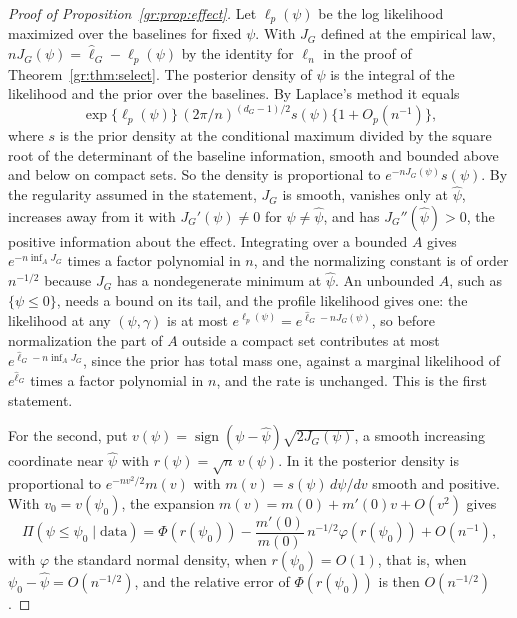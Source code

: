 \begin{proof}[Proof of Proposition~\ref{gr:prop:effect}]
Let $\ell_p(\psi)$ be the log likelihood maximized over the baselines for fixed $\psi$. With $J_G$ defined at the empirical law, $nJ_G(\psi)=\hat\ell_G-\ell_p(\psi)$ by the identity for $\ell_n$ in the proof of Theorem~\ref{gr:thm:select}. The posterior density of $\psi$ is the integral of the likelihood and the prior over the baselines. By Laplace's method it equals
\[
\exp\{\ell_p(\psi)\}\,(2\pi/n)^{(d_G-1)/2}s(\psi)\{1+O_p(n^{-1})\},
\]
where $s$ is the prior density at the conditional maximum divided by the square root of the determinant of the baseline information, smooth and bounded above and below on compact sets. So the density is proportional to $e^{-nJ_G(\psi)}s(\psi)$. By the regularity assumed in the statement, $J_G$ is smooth, vanishes only at $\hat\psi$, increases away from it with $J_G'(\psi)\neq0$ for $\psi\neq\hat\psi$, and has $J_G''(\hat\psi)>0$, the positive information about the effect. Integrating over a bounded $A$ gives $e^{-n\inf_AJ_G}$ times a factor polynomial in $n$, and the normalizing constant is of order $n^{-1/2}$ because $J_G$ has a nondegenerate minimum at $\hat\psi$. An unbounded $A$, such as $\{\psi\le0\}$, needs a bound on its tail, and the profile likelihood gives one: the likelihood at any $(\psi,\gamma)$ is at most $e^{\ell_p(\psi)}=e^{\hat\ell_G-nJ_G(\psi)}$, so before normalization the part of $A$ outside a compact set contributes at most $e^{\hat\ell_G-n\inf_AJ_G}$, since the prior has total mass one, against a marginal likelihood of $e^{\hat\ell_G}$ times a factor polynomial in $n$, and the rate is unchanged. This is the first statement.

For the second, put $v(\psi)=\operatorname{sign}(\psi-\hat\psi)\sqrt{2J_G(\psi)}$, a smooth increasing coordinate near $\hat\psi$ with $r(\psi)=\sqrt n\,v(\psi)$. In it the posterior density is proportional to $e^{-nv^2/2}m(v)$ with $m(v)=s(\psi)\,d\psi/dv$ smooth and positive. With $v_0=v(\psi_0)$, the expansion $m(v)=m(0)+m'(0)v+O(v^2)$ gives
\[
\Pi(\psi\le\psi_0\mid\text{data})=\Phi(r(\psi_0))-\frac{m'(0)}{m(0)}\,n^{-1/2}\varphi(r(\psi_0))+O(n^{-1}),
\]
with $\varphi$ the standard normal density, when $r(\psi_0)=O(1)$, that is, when $\psi_0-\hat\psi=O(n^{-1/2})$, and the relative error of $\Phi(r(\psi_0))$ is then $O(n^{-1/2})$. 


\end{proof}
